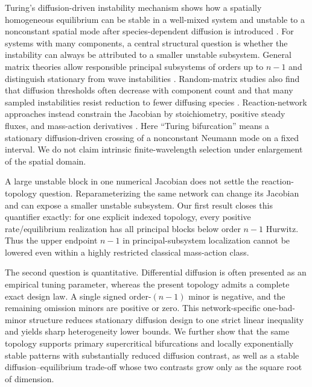 \documentclass[11pt]{article}
\theoremstyle{definition}
\newcommand{\1}{\mathbf 1}
\begin{document}
Turing's diffusion-driven instability mechanism shows how a spatially
homogeneous equilibrium can be stable in a well-mixed system and unstable to a
nonconstant spatial mode after species-dependent diffusion is introduced
\cite{Turing1952}.  For systems with many components, a central structural
question is whether the instability can always be attributed to a smaller
unstable subsystem.  General matrix theories allow responsible principal
subsystems of orders up to $n-1$ and distinguish stationary from wave
instabilities \cite{Satnoianu2000,Anma2012,VillarChampneys2023,VillarCorrection2023}.
Random-matrix studies also find that diffusion thresholds often decrease with
component count and that many sampled instabilities resist reduction to fewer
diffusing species \cite{HaasGoldstein2021}.
Reaction-network approaches instead constrain the Jacobian by stoichiometry,
positive steady fluxes, and mass-action derivatives
\cite{MinchevaCraciun2013,Diego2018,Scholes2019,VassenaStadler2024}.
Here ``Turing bifurcation'' means a stationary diffusion-driven crossing of a
nonconstant Neumann mode on a fixed interval.  We do not claim intrinsic
finite-wavelength selection under enlargement of the spatial domain.

A large unstable block in one numerical Jacobian does not settle the
reaction-topology question.  Reparameterizing the same network can change its
Jacobian and can expose a smaller unstable subsystem.  Our first result closes
this quantifier exactly: for one explicit indexed topology, every positive
rate/equilibrium realization has all principal blocks below order $n-1$
Hurwitz.  Thus the upper endpoint $n-1$ in principal-subsystem localization
cannot be lowered even within a highly restricted classical mass-action
class.

The second question is quantitative.  Differential diffusion is often
presented as an empirical tuning parameter, whereas the present topology
admits a complete exact design law.  A single signed order-$(n-1)$ minor is
negative, and the remaining omission minors are positive or zero.  This network-specific one-bad-minor structure reduces stationary diffusion design to one strict
linear inequality and yields sharp heterogeneity lower bounds.  We further
show that the same topology supports primary supercritical bifurcations and
locally exponentially stable patterns with substantially reduced diffusion
contrast, as well as a stable diffusion--equilibrium trade-off whose two
contrasts grow only as the square root of dimension.
\end{document}
